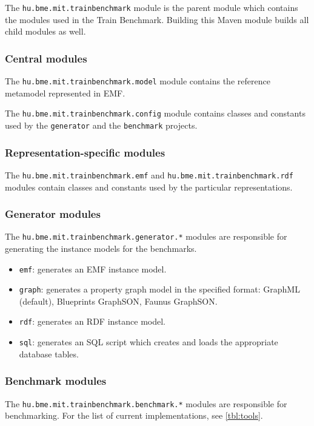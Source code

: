 The \texttt{hu.bme.mit.trainbenchmark} module is the parent module which contains the modules used in the Train Benchmark. Building this Maven module builds all child modules as well.

\subsubsection{Central modules}

The \texttt{hu.bme.mit.trainbenchmark.model} module contains the reference metamodel represented in EMF.

The \texttt{hu.bme.mit.trainbenchmark.config} module contains classes and constants used by the \texttt{generator} and the \texttt{benchmark} projects.

\subsubsection{Representation-specific modules}

The \texttt{hu.bme.mit.trainbenchmark.emf} and \texttt{hu.bme.mit.trainbenchmark.rdf} modules contain classes and constants used by the particular representations.

\subsubsection{Generator modules}

The \texttt{hu.bme.mit.trainbenchmark.generator.*} modules are responsible for generating the instance models for the benchmarks.

\begin{itemize}
  \item \texttt{emf}: generates an EMF instance model.
  \item \texttt{graph}: generates a property graph model in the specified format: GraphML (default), Blueprints GraphSON, Faunus GraphSON.
  \item \texttt{rdf}: generates an RDF instance model.
  \item \texttt{sql}: generates an SQL script which creates and loads the appropriate database tables.
\end{itemize}


\subsubsection{Benchmark modules}

The \texttt{hu.bme.mit.trainbenchmark.benchmark.*} modules are responsible for benchmarking. For the list of current implementations, see \autoref{tbl:tools}.


